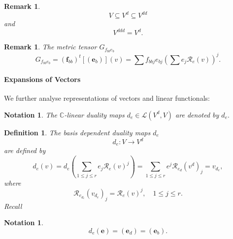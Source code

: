 \documentclass[aps,preprint]{revtex4}
\newtheorem{definition}[theorem]{Definition}
\newtheorem{notation}[theorem]{Notation}
\newtheorem{remark}[theorem]{Remark}
\begin{document}
\begin{remark}
\begin{equation}
V\subseteq V^{d}\subseteq V^{dd}
\end{equation}%
and 
\begin{equation}
V^{ddd}=V^{d}.
\end{equation}
\end{remark}

\begin{remark}
The metric tensor $G_{f_{bb}e_{b}}$ 
\begin{equation}
G_{f_{bb}e_{b}}=\left( \boldsymbol{f}_{bb}\right) ^{t}\left[ \left( 
\boldsymbol{e}_{b}\right) \right] \left( v\right) =\sum f_{bbj}e_{bj}\left(
\sum e_{j}\mathcal{R}_{e}\left( v\right) \right) ^{j}.
\end{equation}
\end{remark}

\paragraph{Expansions of Vectors \label{Expansion of vectors}}

We further analyse representations of vectors and linear functionals:

\begin{notation}
The $\mathbb{C}$-linear duality maps $d_{e}\in \mathcal{L}\left(
V^{d},V\right) $ are denoted by $d_{e}.$
\end{notation}

\begin{definition}
The basis dependent duality maps $d_{e}$ 
\begin{equation}
d_{e}:V\rightarrow V^{d}
\end{equation}%
are defined by 
\begin{equation}
d_{e}\left( v\right) =d_{e}\left( \sum_{1\leq j\leq r}e_{j}\mathcal{R}%
_{e}\left( v\right) ^{j}\right) =\sum_{1\leq j\leq r}e^{j}\mathcal{R}%
_{e_{d}}\left( v^{d}\right) _{j}=v_{d_{e}},
\end{equation}%
where 
\begin{equation}
\mathcal{R}_{e_{d_{e}}}\left( v_{d_{e}}\right) _{j}=\mathcal{R}_{e}\left(
v\right) ^{j},\quad 1\leq j\leq r.
\end{equation}%
Recall
\end{definition}

\begin{notation}
\begin{equation}
d_{e}\left( \boldsymbol{e}\right) =\left( \boldsymbol{e}_{d}\right) =\left( 
\boldsymbol{e}_{b}\right) .
\end{equation}
\end{notation}
\end{document}
